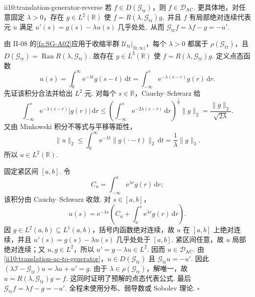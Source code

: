 \begin{FAProposition}[B][平移生成元域反向包含]{ii10:translation-generator-reverse}
若 \(\displaystyle f\in D(\mathcal G_{\mathrm{tr}})\)，则 \(\displaystyle f\in\mathcal D_{\mathrm{AC}}\). 更具体地，对任意固定 \(\displaystyle\lambda>0\)，存在 \(\displaystyle g\in L^2(\mathbb R)\) 使 \(\displaystyle f=R(\lambda,\mathcal G_{\mathrm{tr}})g,\)
并且 \(\displaystyle f\) 有局部绝对连续代表元 \(\displaystyle u\) 满足 \(\displaystyle u'(s)=g(s)-\lambda u(s) \;\text{几乎处处},\)
从而 \(\displaystyle \mathcal G_{\mathrm{tr}}f = \lambda f-g = -u'.\)
\end{FAProposition}

\begin{FAProof}
由 II-08 的\autoref{fa:SG-A02}应用于收缩半群 \(\displaystyle\mathcal U_{\mathrm{tr}}|_{[0,\infty)}\)，每个 \(\displaystyle\lambda>0\) 都属于 \(\displaystyle\rho(\mathcal G_{\mathrm{tr}})\)，且 \(\displaystyle D(\mathcal G_{\mathrm{tr}}) = \operatorname{Ran}R(\lambda,\mathcal G_{\mathrm{tr}}).\)
故存在 \(\displaystyle g\in L^2(\mathbb R)\) 使 \(\displaystyle f=R(\lambda,\mathcal G_{\mathrm{tr}})g\). 定义点态函数
\[
u(s)
=
\int_0^\infty\mathrm{e}^{-\lambda t}g(s-t)\,\mathrm{d}t
=
\int_{-\infty}^s
\mathrm{e}^{-\lambda(s-r)}g(r)\,\mathrm{d}r.
\]
先证该积分合法并给出 \(\displaystyle L^2\) 元. 对每个 \(\displaystyle s\in\mathbb R\)，Cauchy--Schwarz 给
\[
\int_{-\infty}^s
\mathrm{e}^{-\lambda(s-r)}|g(r)|\,\mathrm{d}r
\leqslant
\left(
\int_{-\infty}^s
\mathrm{e}^{-2\lambda(s-r)}\,\mathrm{d}r
\right)^{\frac{1}{2}}
\|g\|_2
=
\frac{\|g\|_2}{\sqrt{2\lambda}}.
\]
又由 Minkowski 积分不等式与平移等距性，
\[
\|u\|_2
\leqslant
\int_0^\infty
\mathrm{e}^{-\lambda t}
\|g(\cdot-t)\|_2
\,\mathrm{d}t
=
\frac1\lambda\|g\|_2.
\]
所以 \(\displaystyle u\in L^2(\mathbb R)\).

固定紧区间 \(\displaystyle[a,b]\). 令
\[
C_a=\int_{-\infty}^a\mathrm{e}^{\lambda r}g(r)\,\mathrm{d}r;
\]
该积分由 Cauchy--Schwarz 收敛. 对 \(\displaystyle s\in[a,b]\)，
\[
u(s)
=
\mathrm{e}^{-\lambda s}
\left(
C_a+\int_a^s\mathrm{e}^{\lambda r}g(r)\,\mathrm{d}r
\right).
\]
因 \(\displaystyle g\in L^2(a,b)\subseteq L^1(a,b)\)，括号内函数绝对连续，故 \(\displaystyle u\) 在 \(\displaystyle[a,b]\) 上绝对连续，并且 \(\displaystyle u'(s)=g(s)-\lambda u(s) \;\text{几乎处处于 }[a,b].\)
紧区间任意，故 \(\displaystyle u\) 局部绝对连续；又 \(\displaystyle u,g\in L^2\)，所以 \(\displaystyle u'=g-\lambda u\in L^2\). 因而 \(\displaystyle u\in\mathcal D_{\mathrm{AC}}\). 由\autoref{ii10:translation-ac-to-generator}，\(\displaystyle u\in D(\mathcal G_{\mathrm{tr}})\) 且 \(\displaystyle\mathcal G_{\mathrm{tr}}u=-u'\). 因此 \(\displaystyle (\lambda\mathcal I-\mathcal G_{\mathrm{tr}})u = \lambda u+u' = g.\)
由于 \(\displaystyle\lambda\in\rho(\mathcal G_{\mathrm{tr}})\)，解唯一，故 \(\displaystyle u=R(\lambda,\mathcal G_{\mathrm{tr}})g=f.\)
这同时证明了预解的点态代表公式. 最后 \(\displaystyle \mathcal G_{\mathrm{tr}}f = \lambda f-g = -u'.\)
全程未使用分布、弱导数或 Sobolev 理论.
\hfill\(\square\)
\end{FAProof}

